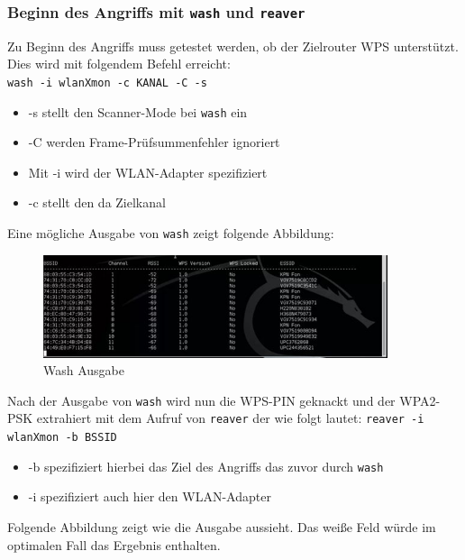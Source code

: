 	\subsubsection{Beginn des Angriffs mit \colorbox{altgray}{\lstinline|wash|} und \colorbox{altgray}{\lstinline|reaver|}}

	Zu Beginn des Angriffs muss getestet werden, ob der Zielrouter WPS unterstützt. Dies wird mit folgendem Befehl erreicht: \\
	\colorbox{altgray}{\lstinline|wash -i wlanXmon -c KANAL -C -s|}\newline
		\begin{itemize}
			\item -s stellt den Scanner-Mode bei \colorbox{altgray}{\lstinline|wash|} ein
			\item -C werden Frame-Prüfsummenfehler ignoriert
			\item Mit -i wird der WLAN-Adapter spezifiziert
			\item -c stellt den da Zielkanal
		\end{itemize}


		Eine mögliche Ausgabe von  \colorbox{altgray}{\lstinline|wash|} zeigt folgende Abbildung:
				\begin{figure}[H]
					\centering
					\includegraphics[width=0.9\textwidth]{images/WLAN/WashWPS.jpg}
					\caption{Wash Ausgabe}
					\label{fig:Wash Ausgabe}
				\end{figure} 
				
\noindent Nach der Ausgabe von \colorbox{altgray}{\lstinline|wash|} wird nun die WPS-PIN geknackt und der WPA2-PSK extrahiert mit dem Aufruf von \colorbox{altgray}{\lstinline|reaver|} der wie folgt lautet:
	\colorbox{altgray}{\lstinline|reaver -i wlanXmon -b BSSID|}
			\begin{itemize}
				\item -b spezifiziert hierbei das Ziel des Angriffs das zuvor durch \colorbox{altgray}{\lstinline|wash|}
				\item -i spezifiziert auch hier den WLAN-Adapter
			\end{itemize}

	\noindent Folgende Abbildung zeigt wie die Ausgabe aussieht. Das weiße Feld würde im optimalen Fall das Ergebnis enthalten.

